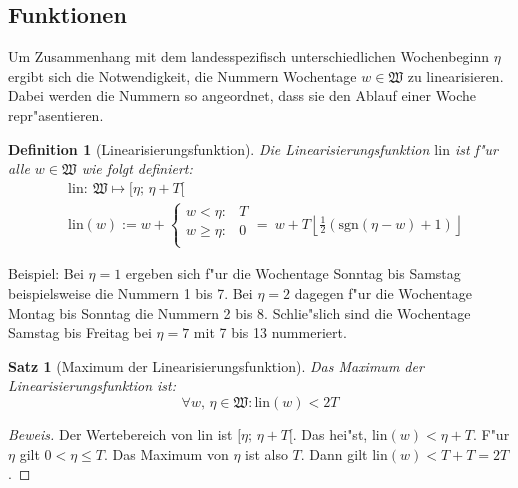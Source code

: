 \documentclass[a4paper]{article}
\newcommand*{\linf}{\mathrm{lin}}
\newcommand*{\sgn}{\mathrm{sgn}}
\newcommand*{\wkdays}{\mathfrak{W}}
\numberwithin{equation}{section}
\newtheorem{dfn}{Definition}
\newtheorem{thm}{Satz}
\begin{document}
%
%
\subsection{Funktionen}
Um Zusammenhang mit dem landesspezifisch unterschiedlichen Wochenbeginn $\eta$
ergibt sich die Notwendigkeit, die Nummern Wochentage $w \in \wkdays$ zu
linearisieren. Dabei werden die Nummern so angeordnet, dass sie den Ablauf einer
Woche repr"asentieren.
\begin{dfn}[Linearisierungsfunktion]\label{def:lin}
  Die Linearisierungsfunktion $\linf$ ist f"ur alle $w \in \wkdays$ wie folgt
  definiert:
  \begin{equation}
  \begin{split}
    & \linf :\ \wkdays \mapsto [\eta;\,\eta + T[ \\
    & \linf(w) := w + \left\{\begin{array}{ll}
        w < \eta : & T \\
        w \ge \eta : & 0 \\
      \end{array}\right. =
      \ w + T\left\lfloor\frac{1}{2}(\sgn(\eta - w) + 1)\right\rfloor
  \end{split}
  \end{equation}
\end{dfn}

\noindent Beispiel: Bei $\eta = 1$ ergeben sich f"ur die Wochentage Sonntag bis
Samstag beispielsweise die Nummern 1 bis 7. Bei $\eta = 2$ dagegen f"ur die
Wochentage Montag bis Sonntag die Nummern 2 bis 8. Schlie"slich sind die
Wochentage Samstag bis Freitag bei $\eta = 7$ mit 7 bis 13 nummeriert.

\begin{thm}[Maximum der Linearisierungsfunktion]\label{thm:maxLin}
  Das Maximum der Linearisierungsfunktion ist:
  \begin{equation}\forall w,\,\eta \in \wkdays : \linf(w) < 2T\end{equation}
\end{thm}
\begin{proof}[Beweis]
  Der Wertebereich von $\linf$ ist $[\eta;\,\eta + T[$. Das hei"st,
  $\linf(w) < \eta + T$. F"ur $\eta$ gilt $0 < \eta \le T$. Das Maximum von
  $\eta$ ist also $T$. Dann gilt $\linf(w) < T + T = 2T$.
\end{proof}
\end{document}
